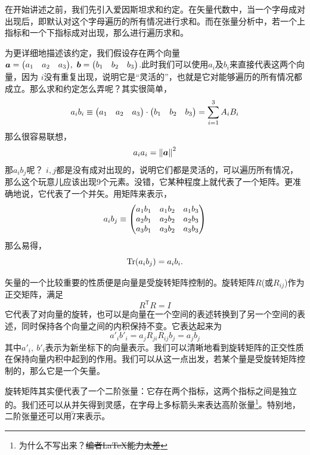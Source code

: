 \documentclass[12pt,a4paper,openany,twoside]{book}
\numberwithin{equation}{section}
\begin{document}
        在开始讲述之前，我们先引入爱因斯坦求和约定。在矢量代数中，当一个字母成对出现后，即默认对这个字母遍历的所有情况进行求和。而在张量分析中，若一个上指标和一个下指标成对出现，那么进行遍历求和。

        为更详细地描述该约定，我们假设存在两个向量$\vb*{a}=\mqty(\xmat*{a}{1}{3}),\ \vb*{b}=\mqty(\xmat*{b}{1}{3})$.此时我们可以使用$a_i$及$b_i$来直接代表这两个向量，因为 $i$没有重复出现，说明它是“灵活的”，也就是它对能够遍历的所有情况都成立。那么求和约定怎么弄呢？其实很简单，
        \begin{equation*}
          a_ib_i\equiv\mqty(\xmat*{a}{1}{3})\cdot\mqty(\xmat*{b}{1}{3})=\sum_{i=1}^3{A_iB_i}
        \end{equation*} 
        那么很容易联想，
        \begin{equation*}
          a_ia_i=\norm{\vb*{a}}^2
        \end{equation*} 
        那$a_ib_j$呢？ $i,j$都是没有成对出现的，说明它们都是灵活的，可以遍历所有情况，那么这个玩意儿应该出现9个元素。没错，它某种程度上就代表了一个矩阵。更准确地说，它代表了一个并矢。用矩阵来表示，
        \begin{equation*}
          a_ib_j\equiv\mqty(
            a_1b_1 & a_1b_2 & a_1b_3 \\
            a_2b_1 & a_2b_2 & a_2b_3 \\
            a_3b_1 & a_3b_2 & a_3b_3 
          )
        \end{equation*} 
        那么易得，
        \begin{equation}
          \Tr(a_ib_j)=a_ib_i.
        \end{equation}

        矢量的一个比较重要的性质便是向量是受旋转矩阵控制的。旋转矩阵$R$(或$R_{ij}$)作为正交矩阵，满足
        \begin{equation*}
          R^\mathsf{T}R=I
        \end{equation*}
        它代表了对向量的旋转，也可以是向量在一个空间的表述转换到了另一个空间的表述，同时保持各个向量之间的内积保持不变。它表达起来为
        \begin{equation*}
          a'_ib'_i=a_jR_{ji}R_{ij}b_j=a_jb_j
        \end{equation*} 
        其中$a'_i,\ b'_i$表示为新坐标下的向量表示。我们可以清晰地看到旋转矩阵的正交性质在保持向量内积中起到的作用。我们可以从这一点出发，若某个量是受旋转矩阵控制的，那么它是一个矢量。

        旋转矩阵其实便代表了一个二阶张量：它存在两个指标，这两个指标之间是独立的。我们还可以从并矢得到灵感，在字母上多标箭头来表达高阶张量\footnote{为什么不写出来？\sout{编者\LaTeX 能力太差}}。特别地，二阶张量还可以用$\overleftrightarrow{T}$来表示。
\end{document}

